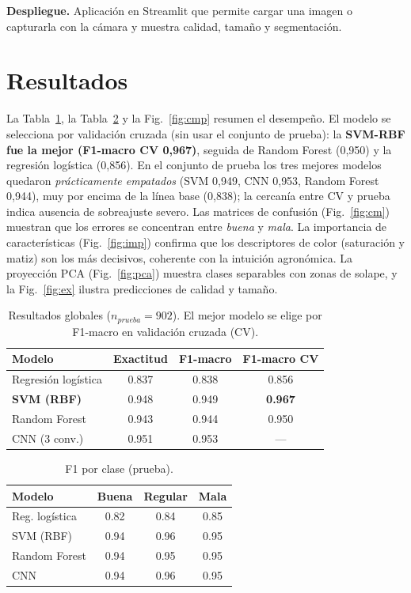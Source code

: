 \documentclass[conference]{IEEEtran}
\begin{document}
\textbf{Despliegue.} Aplicación en Streamlit que permite cargar una imagen o
capturarla con la cámara y muestra calidad, tamaño y segmentación.

\section{Resultados}
La Tabla~\ref{tab:res}, la Tabla~\ref{tab:pc} y la Fig.~\ref{fig:cmp} resumen el
desempeño. El modelo se selecciona por validación cruzada (sin usar el conjunto
de prueba): la \textbf{SVM-RBF fue la mejor (F1-macro CV 0{,}967)}, seguida de
Random Forest (0{,}950) y la regresión logística (0{,}856). En el conjunto de
prueba los tres mejores modelos quedaron \emph{prácticamente empatados} (SVM
0{,}949, CNN 0{,}953, Random Forest 0{,}944), muy por encima de la línea base
(0{,}838); la cercanía entre CV y prueba indica ausencia de sobreajuste severo. Las matrices de
confusión (Fig.~\ref{fig:cm}) muestran que los errores se concentran entre
\emph{buena} y \emph{mala}. La importancia de características
(Fig.~\ref{fig:imp}) confirma que los descriptores de color (saturación y matiz)
son los más decisivos, coherente con la intuición agronómica. La proyección PCA
(Fig.~\ref{fig:pca}) muestra clases separables con zonas de solape, y la
Fig.~\ref{fig:ex} ilustra predicciones de calidad y tamaño.

\begin{table}[t]
\caption{Resultados globales ($n_{prueba}=902$). El mejor modelo se elige por
F1-macro en validación cruzada (CV).}
\label{tab:res}
\centering
\begin{tabular}{lccc}
\toprule
Modelo & Exactitud & F1-macro & F1-macro CV \\
\midrule
Regresión logística & 0.837 & 0.838 & 0.856 \\
\textbf{SVM (RBF)}  & 0.948 & 0.949 & \textbf{0.967} \\
Random Forest       & 0.943 & 0.944 & 0.950 \\
CNN (3 conv.)       & 0.951 & 0.953 & --- \\
\bottomrule
\end{tabular}
\end{table}

\begin{table}[t]
\caption{F1 por clase (prueba).}
\label{tab:pc}
\centering
\begin{tabular}{lccc}
\toprule
Modelo & Buena & Regular & Mala \\
\midrule
Reg. logística & 0.82 & 0.84 & 0.85 \\
SVM (RBF)      & 0.94 & 0.96 & 0.95 \\
Random Forest  & 0.94 & 0.95 & 0.95 \\
CNN            & 0.94 & 0.96 & 0.95 \\
\bottomrule
\end{tabular}
\end{table}
\end{document}

